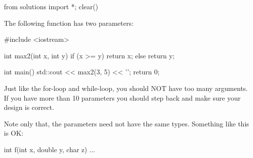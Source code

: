 \begin{python0}
from solutions import *; clear()
\end{python0}

The following function has two parameters:

\begin{consolethree}[escapeinside=||]
#include <iostream>

int max2(int x, int y)
{
    if (x >= y)
    {
        return x;
    }
    else
    {
        return y;
    }
}

int main()
{
    std::cout << max2(3, 5) << '\n';
    return 0;
}
\end{consolethree}

Just like the for-loop and while-loop, you should NOT have too many arguments. If you have more than 10 parameters you should step back and make sure your design is correct.

Note only that, the parameters need not have the same types. Something like this is OK:

\begin{consolethree}[escapeinside=||]
int f(int x, double y, char z)
{
    ...
}
\end{consolethree}


